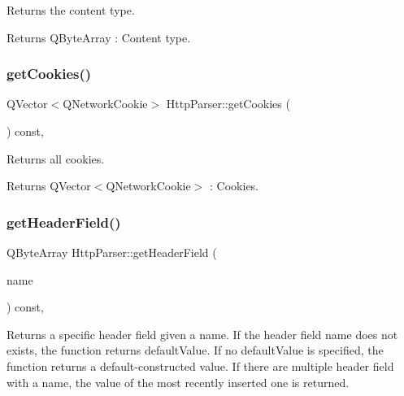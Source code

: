 Returns the content type. 

\begin{DoxyReturn}{Returns}
Q\+Byte\+Array \+: Content type. 
\end{DoxyReturn}
\mbox{\label{class_http_parser_ac07c6676461725678a6fe7fcae7e79f7}} 
\subsubsection{\texorpdfstring{get\+Cookies()}{getCookies()}}
{\footnotesize\ttfamily Q\+Vector$<$Q\+Network\+Cookie$>$ Http\+Parser\+::get\+Cookies (\begin{DoxyParamCaption}{ }\end{DoxyParamCaption}) const\hspace{0.3cm}{\ttfamily [inline]}, {\ttfamily [noexcept]}}



Returns all cookies. 

\begin{DoxyReturn}{Returns}
Q\+Vector$<$\+Q\+Network\+Cookie$>$ \+: Cookies. 
\end{DoxyReturn}
\mbox{\label{class_http_parser_adabda41fe6457ab14b573a32085c2eea}} 
\subsubsection{\texorpdfstring{get\+Header\+Field()}{getHeaderField()}}
{\footnotesize\ttfamily Q\+Byte\+Array Http\+Parser\+::get\+Header\+Field (\begin{DoxyParamCaption}\item[{const Q\+Byte\+Array \&}]{name }\end{DoxyParamCaption}) const\hspace{0.3cm}{\ttfamily [inline]}, {\ttfamily [noexcept]}}



Returns a specific header field given a name. If the header field name does not exists, the function returns default\+Value. If no default\+Value is specified, the function returns a default-\/constructed value. If there are multiple header field with a name, the value of the most recently inserted one is returned. 



